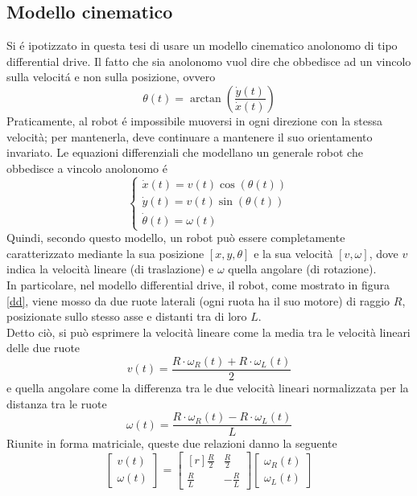 \documentclass[14pt,a4paper]{extarticle}
\begin{document}
\subsection{Modello cinematico}
Si é ipotizzato in questa tesi di usare un modello cinematico anolonomo di tipo differential drive. Il fatto che sia anolonomo vuol dire che obbedisce ad un vincolo sulla velocitá e non sulla posizione, ovvero \[\theta(t) = \arctan \left( \frac{\dot{y}(t)}{\dot{x}(t)} \right) \] Praticamente, al robot é impossibile muoversi in ogni direzione con la stessa velocità; per mantenerla, deve continuare a mantenere il suo orientamento invariato. Le equazioni differenziali che modellano un generale robot che obbedisce a vincolo anolonomo é
\begin{equation}
\label{anolomeq}
\begin{cases}
\dot{x}(t) = v(t)\cos(\theta(t)) \\
\dot{y}(t) = v(t)\sin(\theta(t)) \\
\dot{\theta}(t) = \omega(t)
\end{cases}
\end{equation} 
Quindi, secondo questo modello, un robot può essere completamente caratterizzato mediante la sua posizione \([x,y,\theta]\) e la sua velocità \([v,\omega]\), dove \(v\) indica la velocità lineare (di traslazione) e \(\omega\) quella angolare (di rotazione).\\
In particolare, nel modello differential drive, il robot, come mostrato in figura \ref{dd}, viene mosso da due ruote laterali (ogni ruota ha il suo motore) di raggio \(R\), posizionate sullo stesso asse e distanti tra di loro \(L\).\\
Detto ciò, si può esprimere la velocità lineare come la media tra le velocità lineari delle due ruote \[v(t)=\frac{R\cdot\omega_R(t)+R\cdot\omega_L(t)}{2}\] e quella angolare come la differenza tra le due velocità lineari normalizzata per la distanza tra le ruote \[\omega(t)=\frac{R\cdot\omega_R(t)-R\cdot\omega_L(t)}{L}\] Riunite in forma matriciale, queste due relazioni danno la seguente
\begin{equation}
\begin{bmatrix}
v(t) \\
\omega(t)
\end{bmatrix}
=
\begin{bmatrix*}[r]
\frac{R}{2} & \frac{R}{2} \\
\frac{R}{L} & -\frac{R}{L}
\end{bmatrix*}
\begin{bmatrix}
\omega_R(t) \\
\omega_L(t)
\end{bmatrix}
\end{equation} 
\end{document}
